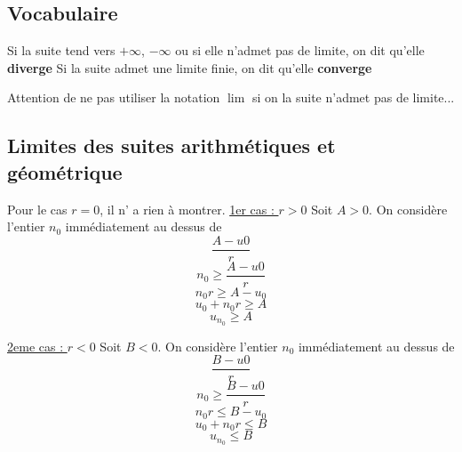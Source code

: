 \subsection{Vocabulaire}
Si la suite tend vers $+\infty$, $-\infty$ ou si elle n'admet pas de limite, on dit qu'elle \textbf{diverge} \newline
Si la suite admet une limite finie, on dit qu'elle \textbf{converge}\newline


\begin{remarque}
Attention de ne pas utiliser la notation $\lim$ si on la suite n'admet pas de limite...
\end{remarque}
\subsection{Limites des suites arithmétiques et géométrique}
\newline

\begin{preuve}
Pour le cas $r = 0$, il n' a rien à montrer.\newline
\underline{1er cas : $r > 0$} \newline
Soit $A > 0$. On considère l'entier $n_0$ immédiatement au dessus de $$\dfrac{A - u0}{r}$$
$$n_0 \geq \dfrac{A - u0}{r}$$
$$n_0 r \geq A - u_0$$
$$u_0 +n_0 r \geq A$$
$$u_{n_0} \geq A$$


\underline{2eme cas : $r < 0$} \newline
Soit $B < 0$. On considère l'entier $n_0$ immédiatement au dessus de $$\dfrac{B - u0}{r}$$
$$n_0 \geq \dfrac{B - u0}{r}$$
$$n_0 r \leq  B - u_0$$
$$u_0 +n_0 r \leq B$$
$$u_{n_0} \leq B$$
\end{preuve}
